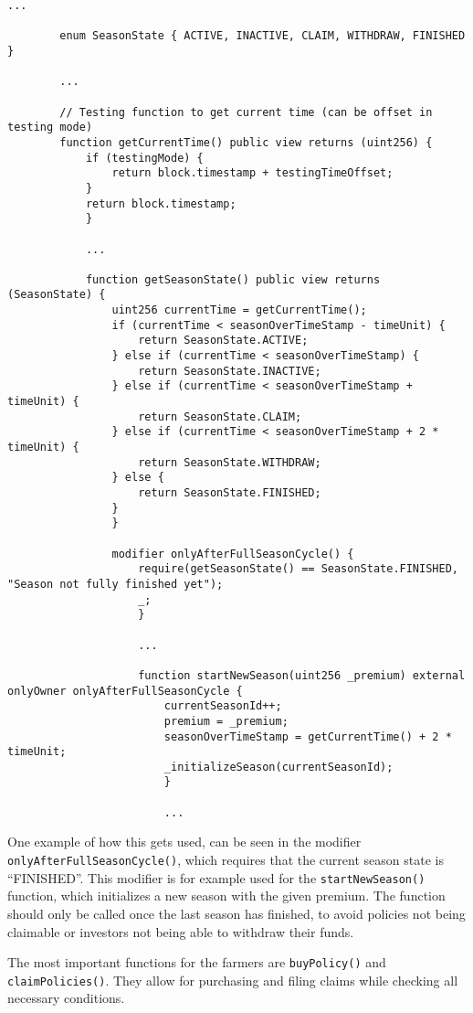 \documentclass[11pt,a4paper]{article}
\begin{document}
		\begin{lstlisting}[style=soliditystyle, caption={RainyDayFund.sol - Main Insurance Contract},label={lst:contract-state}]
		...

		enum SeasonState { ACTIVE, INACTIVE, CLAIM, WITHDRAW, FINISHED }

		...

		// Testing function to get current time (can be offset in testing mode)
		function getCurrentTime() public view returns (uint256) {
			if (testingMode) {
				return block.timestamp + testingTimeOffset;
			}
			return block.timestamp;
			}

			...

			function getSeasonState() public view returns (SeasonState) {
				uint256 currentTime = getCurrentTime();
				if (currentTime < seasonOverTimeStamp - timeUnit) {
					return SeasonState.ACTIVE;
				} else if (currentTime < seasonOverTimeStamp) {
					return SeasonState.INACTIVE;
				} else if (currentTime < seasonOverTimeStamp + timeUnit) {
					return SeasonState.CLAIM;
				} else if (currentTime < seasonOverTimeStamp + 2 * timeUnit) {
					return SeasonState.WITHDRAW;
				} else {
					return SeasonState.FINISHED;
				}
				}

				modifier onlyAfterFullSeasonCycle() {
					require(getSeasonState() == SeasonState.FINISHED, "Season not fully finished yet");
					_;
					}

					...

					function startNewSeason(uint256 _premium) external onlyOwner onlyAfterFullSeasonCycle {
						currentSeasonId++;
						premium = _premium;
						seasonOverTimeStamp = getCurrentTime() + 2 * timeUnit;
						_initializeSeason(currentSeasonId);
						}

						...
		\end{lstlisting}

		One example of how this gets used, can be seen in the modifier \texttt{onlyAfterFullSeasonCycle()}, which requires that the current season state is \enquote{FINISHED}.
		This modifier is for example used for the \texttt{startNewSeason()} function, which initializes a new season with the given premium.
		The function should only be called once the last season has finished, to avoid policies not being claimable or investors not being able to withdraw their funds.

		The most important functions for the farmers are \texttt{buyPolicy()} and \texttt{claimPolicies()}.
		They allow for purchasing and filing claims while checking all necessary conditions.
\end{document}

